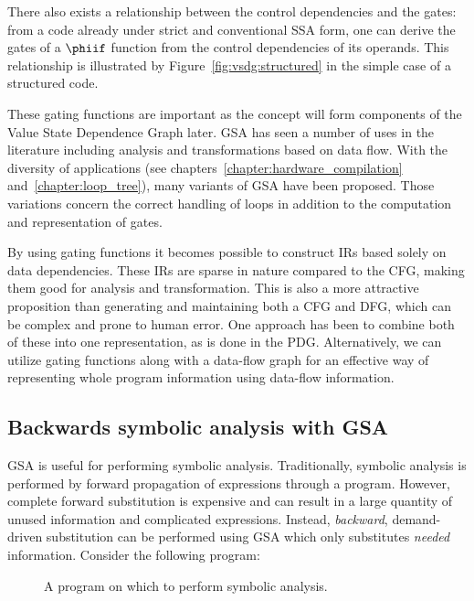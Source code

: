 There also exists a relationship between the control dependencies and the gates: from a code already under strict and conventional SSA form, one can derive the gates of a $\phiif$ function from the control dependencies of its operands. This relationship is illustrated by Figure~\ref{fig:vsdg:structured} in the simple case of a structured code.
 
These gating functions are important as the concept will form components of the Value State Dependence Graph later. GSA has seen a number of uses in the literature including analysis and transformations based on data flow. 
With the diversity of applications (see chapters~\ref{chapter:hardware_compilation} and~\ref{chapter:loop_tree}), many variants of GSA have been proposed. Those variations concern the correct handling of loops in addition to the computation and representation of gates. 


By using gating functions it becomes possible to construct IRs based solely on data dependencies. These IRs are sparse in nature compared to the CFG, making them good for analysis and transformation. This is also a more attractive proposition than generating and maintaining both a CFG and DFG, which can be complex and prone to human error. One approach has been to combine both of these into one representation, as is done in the PDG. Alternatively, we can utilize gating functions along with a data-flow graph for an effective way of representing whole program information using data-flow information.

\subsection{Backwards symbolic analysis with GSA}

GSA is useful for performing symbolic analysis. Traditionally, symbolic analysis is performed by forward propagation of expressions through a program. However, complete forward substitution is expensive and can result in a large quantity of unused information and complicated expressions. Instead, \textit{backward}, demand-driven substitution can be performed using GSA which only substitutes \textit{needed} information. Consider the following program:

\begin{figure*}[ht]
\centering
{}
\caption{A program on which to perform symbolic analysis.}
\label{fig:tupaduaexample}
\end{figure*}

